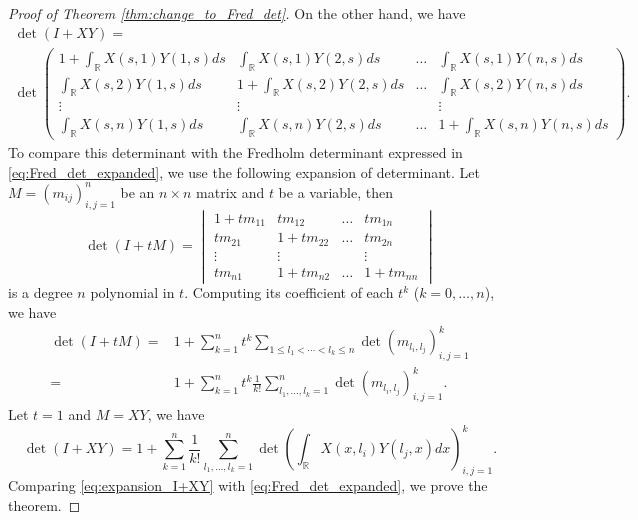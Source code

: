 \documentclass[11pt, a4paper]{article}
\numberwithin{equation}{section}
\newcommand{\realR}{\mathbb{R}}
\theoremstyle{definition}
\theoremstyle{remark}
\begin{document}
\begin{proof}[Proof of Theorem \ref{thm:change_to_Fred_det}]
  On the other hand, we have
  \begin{multline}
    \det(I + XY) = \\
    \det
    \begin{pmatrix}
      1 + \int_{\realR} X(s, 1) Y(1, s) ds & \int_{\realR} X(s, 1) Y(2, s) ds & \dots & \int_{\realR} X(s, 1) Y(n, s) ds \\
      \int_{\realR} X(s, 2) Y(1, s) ds & 1 + \int_{\realR} X(s, 2) Y(2, s) ds & \dots & \int_{\realR} X(s, 2) Y(n, s) ds \\
      \vdots & \vdots & & \vdots \\
      \int_{\realR} X(s, n) Y(1, s) ds & \int_{\realR} X(s, n) Y(2, s) ds & \dots & 1 + \int_{\realR} X(s, n) Y(n, s) ds
    \end{pmatrix}.
  \end{multline}
  To compare this determinant with the Fredholm determinant expressed in \eqref{eq:Fred_det_expanded}, we use the following expansion of determinant. Let $M = (m_{ij})^n_{i, j = 1}$ be an $n \times n$ matrix and $t$ be a variable, then
  \begin{equation}
    \det(I + tM) =
    \begin{vmatrix}
      1 + t m_{11} & t m_{12} & \dots & t m_{1n} \\
      t m_{21} & 1 + t m_{22} & \dots & t m_{2n} \\
      \vdots & \vdots & & \vdots \\
      t m_{n1} & 1 + t m_{n2} & \dots & 1 + t m_{nn}
    \end{vmatrix}
  \end{equation}
  is a degree $n$ polynomial in $t$. Computing its coefficient of each $t^k$ ($k = 0, \dotsc, n$), we have
  \begin{equation}
    \begin{split}
    \det(I + tM) = {}& 1 + \sum^n_{k = 1} t^k \sum_{1 \leq l_1 < \dotsb < l_k \leq n} \det(m_{l_i, l_j})^k_{i, j = 1} \\
    = {}& 1 + \sum^n_{k = 1} t^k \frac{1}{k!} \sum^n_{l_1, \dotsc, l_k = 1} \det(m_{l_i, l_j})^k_{i, j = 1}.
    \end{split}
  \end{equation}
  Let $t = 1$ and $M = XY$, we have
  \begin{equation} \label{eq:expansion_I+XY}
    \det(I + XY) = 1 + \sum^n_{k = 1} \frac{1}{k!} \sum^n_{l_1, \dotsc, l_k = 1} \det \left( \int_{\realR} X(x, l_i) Y(l_j, x) dx \right)^k_{i, j = 1}.
  \end{equation}
  Comparing \eqref{eq:expansion_I+XY} with \eqref{eq:Fred_det_expanded}, we prove the theorem.
\end{proof}
\end{document}
